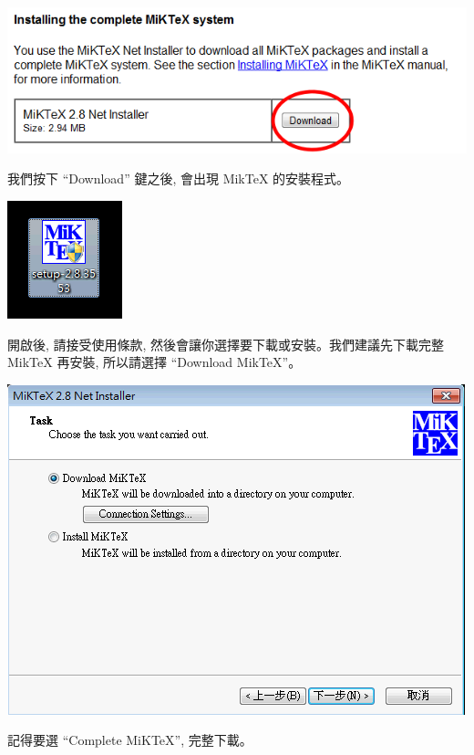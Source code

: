 \documentclass[12pt]{report}
\begin{document}
\begin{center}
\includegraphics[scale=0.5]{miktexInstaller.png}
\end{center}

我們按下 ``Download'' 鍵之後, 會出現 MikTeX 的安裝程式。

\begin{center}
\includegraphics[scale=0.5]{miktexsetup.png}
\end{center}

開啟後, 請接受使用條款, 然後會讓你選擇要下載或安裝。我們建議先下載完整 MikTeX 再安裝, 所以請選擇 ``Download MikTeX''。

\begin{center}
\includegraphics[scale=0.5]{DownloadMikTeX.png}
\end{center}

記得要選 ``Complete MiKTeX'', 完整下載。
\end{document}
